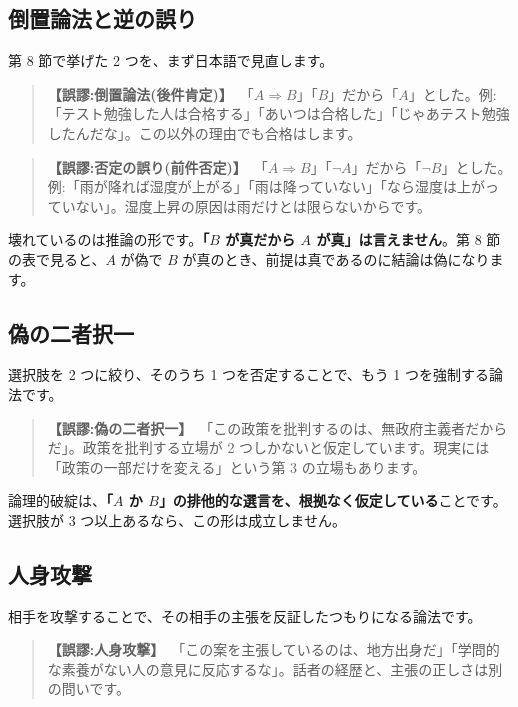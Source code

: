 \documentclass{article}
\begin{document}
\subsection{倒置論法と逆の誤り}

第 8 節で挙げた 2 つを、まず日本語で見直します。

\begin{quote}
\textbf{【誤謬:倒置論法(後件肯定)】}\  「\(A \Rightarrow B\)」「\(B\)」だから「\(A\)」とした。例:「テスト勉強した人は合格する」「あいつは合格した」「じゃあテスト勉強したんだな」。この以外の理由でも合格はします。
\end{quote}

\begin{quote}
\textbf{【誤謬:否定の誤り(前件否定)】}\  「\(A \Rightarrow B\)」「\(\neg A\)」だから「\(\neg B\)」とした。例:「雨が降れば湿度が上がる」「雨は降っていない」「なら湿度は上がっていない」。湿度上昇の原因は雨だけとは限らないからです。
\end{quote}

壊れているのは推論の形です。\textbf{「\(B\) が真だから \(A\) が真」は言えません}。第 8 節の表で見ると、\(A\) が偽で \(B\) が真のとき、前提は真であるのに結論は偽になります。

\subsection{偽の二者択一}

選択肢を 2 つに絞り、そのうち 1 つを否定することで、もう 1 つを強制する論法です。

\begin{quote}
\textbf{【誤謬:偽の二者択一】}\ 「この政策を批判するのは、無政府主義者だからだ」。政策を批判する立場が 2 つしかないと仮定しています。現実には「政策の一部だけを変える」という第 3 の立場もあります。
\end{quote}

論理的破綻は、\textbf{「\(A\) か \(B\)」の排他的な選言を、根拠なく仮定している}ことです。選択肢が 3 つ以上あるなら、この形は成立しません。

\subsection{人身攻撃}

相手を攻撃することで、その相手の主張を反証したつもりになる論法です。

\begin{quote}
\textbf{【誤謬:人身攻撃】}\ 「この案を主張しているのは、地方出身だ」「学問的な素養がない人の意見に反応するな」。話者の経歴と、主張の正しさは別の問いです。
\end{quote}
\end{document}
